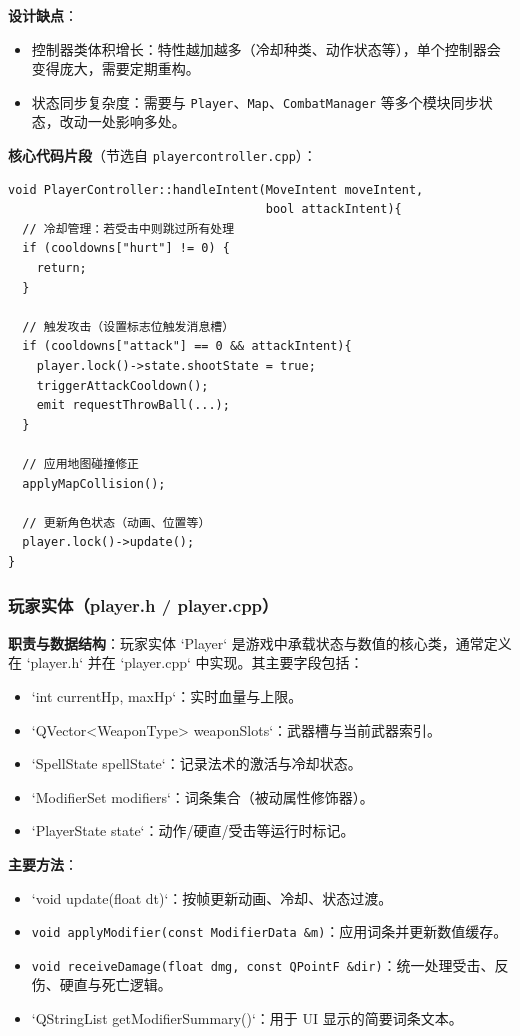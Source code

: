﻿\documentclass[utf8]{ctexart}
\begin{document}
\textbf{设计缺点}：

\begin{itemize}
  \item 控制器类体积增长：特性越加越多（冷却种类、动作状态等），单个控制器会变得庞大，需要定期重构。
  \item 状态同步复杂度：需要与 \texttt{Player}、\texttt{Map}、\texttt{CombatManager} 等多个模块同步状态，改动一处影响多处。
\end{itemize}

\textbf{核心代码片段}（节选自 \texttt{playercontroller.cpp}）：

\begin{verbatim}
void PlayerController::handleIntent(MoveIntent moveIntent, 
                                    bool attackIntent){
  // 冷却管理：若受击中则跳过所有处理
  if (cooldowns["hurt"] != 0) { 
    return; 
  }
  
  // 触发攻击（设置标志位触发消息槽）
  if (cooldowns["attack"] == 0 && attackIntent){
    player.lock()->state.shootState = true; 
    triggerAttackCooldown();
    emit requestThrowBall(...);
  }
  
  // 应用地图碰撞修正
  applyMapCollision(); 
  
  // 更新角色状态（动画、位置等）
  player.lock()->update();
}
\end{verbatim}

\subsubsection{玩家实体（player.h / player.cpp）}

\textbf{职责与数据结构}：玩家实体 `Player` 是游戏中承载状态与数值的核心类，通常定义在 `player.h` 并在 `player.cpp` 中实现。其主要字段包括：

\begin{itemize}
  \item `int currentHp, maxHp`：实时血量与上限。
  \item `QVector<WeaponType> weaponSlots`：武器槽与当前武器索引。
  \item `SpellState spellState`：记录法术的激活与冷却状态。
  \item `ModifierSet modifiers`：词条集合（被动属性修饰器）。
  \item `PlayerState state`：动作/硬直/受击等运行时标记。
\end{itemize}

\textbf{主要方法}：

\begin{itemize}
  \item `void update(float dt)`：按帧更新动画、冷却、状态过渡。
  \item \texttt{void applyModifier(const ModifierData \&m)}：应用词条并更新数值缓存。
  \item \texttt{void receiveDamage(float dmg, const QPointF \&dir)}：统一处理受击、反伤、硬直与死亡逻辑。
  \item `QStringList getModifierSummary()`：用于 UI 显示的简要词条文本。
\end{itemize}
\end{document}
